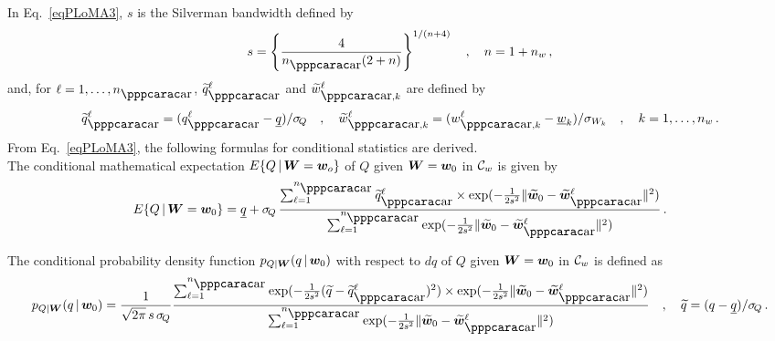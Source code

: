 %
In Eq.~\eqref{eqPLoMA3}, $s$ is the Silverman bandwidth defined by 
%
\begin{equation}\label{eqPLoMA4}
    s = \left\{\frac{4}{n_\ar(2+n)} \right\}^{1/(n + 4)}\quad ,\quad n = 1 + n_w \,,
\end{equation}
%
and, for $\ell=1,\ldots , n_\ar$, $\widetilde{q}_\ar^\ell$ and $\widetilde{w}^\ell_{\ar,k}$ are defined by
%
\begin{equation}\label{eqPLoMA5}
    \widetilde{q}_\ar^\ell = (q_\ar^\ell - \underline{q}) /{{\sigma_{\! Q}}}\quad , \quad
    \widetilde{w}^\ell_{\ar,k} = ({w}^\ell_{\ar,k} - \underline{w}_k) /{{\sigma_{W_k}}} \quad , \quad k=1,\ldots, n_w \,.
\end{equation}
%
From Eq.~\eqref{eqPLoMA3}, the following formulas for conditional statistics are derived.\\

 The conditional mathematical expectation $E\{Q \, \vert \, {\boldsymbol{W}} = {\boldsymbol{w}}_o\}$ of $Q$ given ${\boldsymbol{W}} = {\boldsymbol{w}}_0$ in ${\mathcal{C}}_w$ is given by
%
\begin{equation}
    E\{Q \, \vert \, \bfW = \bfw_0\} = \underline{q} + \sigma_{\! Q}\, \frac{\sum_{\ell=1}^{n_\ar}\widetilde{q}^{\ell}_{\ar} \times \exp({-\frac{1}{2s^2}\Vert \widetilde{\bfw}_{0}  -\widetilde{\bfw}^\ell_\ar \Vert^2})}{\sum_{\ell =  1}^{n_\ar}\exp({-\frac{1}{2s^2}\Vert \widetilde{\bfw}_{0} - \widetilde{\bfw}^\ell_\ar \Vert^2})} \,.
     \label{eqPLoM6}
\end{equation}
%

 The conditional probability density function  $p_{Q \vert {\boldsymbol{W}}} (q\, \vert \, {\boldsymbol{w}}_0)$ with respect to $dq$ of $Q$ given ${\boldsymbol{W}} = {\boldsymbol{w}}_0$ in ${\mathcal{C}}_w$ is defined as
%
\begin{equation}
      p_{Q \vert \bfW} (q\, \vert \, \bfw_0)  = \frac{1}{\sqrt{2\pi}\,  s \,\sigma_{\! Q}}
      \frac{\sum_{\ell=1}^{n_\ar}
       \exp({-\frac{1}{2s^2}( \widetilde{q} - \widetilde{q}^\ell_\ar )^2})      
      \times \exp({-\frac{1}{2s^2}\Vert \widetilde{\bfw}_{0}  -\widetilde{\bfw}^\ell_\ar \Vert^2})}{\sum_{\ell =  1}^{n_\ar}\exp({-\frac{1}{2s^2}\Vert \widetilde{\bfw}_{0} - \widetilde{\bfw}^\ell_\ar \Vert^2})} \quad , \quad
      \widetilde{q} = (q - \underline{q}) /{{\sigma_{\! Q}}} \, .
     \label{eqPLoM7}
\end{equation}
%

